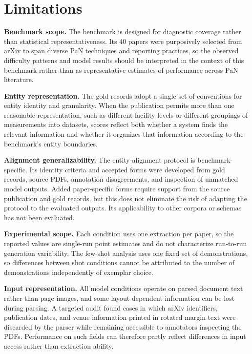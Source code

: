 \section*{Limitations}
\label{sec:limitations}

\textbf{Benchmark scope.}
The benchmark is designed for diagnostic coverage rather than statistical
representativeness. Its 40 papers were purposively selected from arXiv to span
diverse PaN techniques and reporting practices, so the observed difficulty
patterns and model results should be interpreted in the context of this
benchmark rather than as representative estimates of performance across PaN
literature.

\textbf{Entity representation.}
The gold records adopt a single set of conventions for entity identity and
granularity. When the publication permits more than one reasonable
representation, such as different facility levels or different groupings of
measurements into datasets, scores reflect both whether a system finds the
relevant information and whether it organizes that information according to
the benchmark's entity boundaries.

\textbf{Alignment generalizability.}
The entity-alignment protocol is benchmark-specific. Its identity criteria
and accepted forms were developed from gold records, source PDFs,
annotation disagreements, and inspection of unmatched model outputs.
Added paper-specific forms require support from the source publication
and gold records, but this does not eliminate the risk of adapting the
protocol to the evaluated outputs. Its applicability to other corpora
or schemas has not been evaluated.

\textbf{Experimental scope.}
Each condition uses one extraction per paper, so the reported values are
single-run point estimates and do not characterize run-to-run generation
variability. The few-shot analysis uses one fixed set of demonstrations,
so differences between shot conditions cannot be attributed to the number
of demonstrations independently of exemplar choice.

\textbf{Input representation.}
All model conditions operate on parsed document text rather than page images,
and some layout-dependent information can be lost during parsing. A targeted
audit found cases in which arXiv identifiers, publication dates, and venue
information printed in rotated margin text were discarded by the parser while
remaining accessible to annotators inspecting the PDFs. Performance on such
fields can therefore partly reflect differences in input access rather than
extraction ability.
